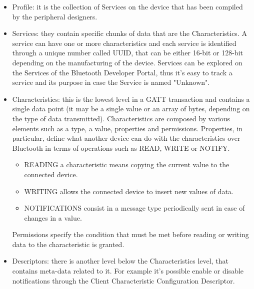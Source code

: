 \begin{itemize}
	\item Profile: it is the collection of Services on the device that has been compiled by the peripheral designers.
	
	\item Services: they contain specific chunks of data that are the Characteristics. A service can have one or more characteristics and each service is identified through a unique number called UUID, that can be either 16-bit or 128-bit depending on the manufacturing of the device. Services can be explored on the Services of the Bluetooth Developer Portal, thus it's easy to track a service and its purpose in case the Service is named "Unknown".
	
	\item Characteristics: this is the lowest level in a GATT transaction and contains a single data point (it may be a single value or an array of bytes, depending on the type of data transmitted). Characteristics are composed by various elements such as a type, a value, properties and permissions.
	Properties, in particular, define what another device can do with the characteristics over Bluetooth in terms of operations such as READ, WRITE or NOTIFY.
	\begin{itemize}
		\item READING a characteristic means copying the current value to the connected device.
		\item WRITING allows the connected device to insert new values of data.
		\item NOTIFICATIONS consist in a message type periodically sent in case of changes in a value.
	\end{itemize}
	Permissions specify the condition that must be met before reading or writing data to the characteristic is granted.
	
	\item Descriptors: there is another level below the Characteristics level, that contains meta-data related to it. For example it's possible enable or disable notifications through the Client Characteristic Configuration Descriptor.
\end{itemize}
